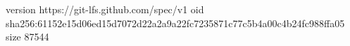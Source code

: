 version https://git-lfs.github.com/spec/v1
oid sha256:61152e15d06ed15d7072d22a2a9a22fc7235871c77c5b4a00c4b24fc988ffa05
size 87544
